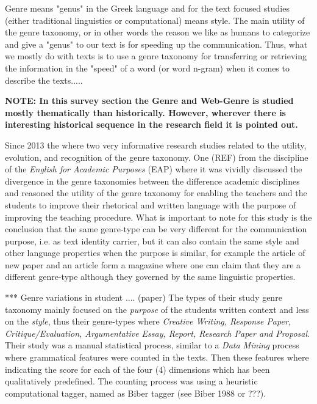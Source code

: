 Genre means "genus" in the Greek language and for the text focused studies (either traditional linguistics or computational) means style. The main utility of the genre taxonomy, or in other words the reason we like as humans to categorize and give a "genus" to our text is for speeding up the communication. Thus, what we mostly do with texts is to use a genre taxonomy for transferring or retrieving the information in the "speed" of a word (or word n-gram) when it comes to describe the texts.....

\textbf{NOTE: In this survey section the Genre and Web-Genre is studied mostly thematically than historically. However, wherever there is interesting historical sequence in the research field it is pointed out.}


Since 2013 the where two very informative research studies related to the utility, evolution, and recognition of the genre taxonomy. One (REF) from the discipline of the \textit{English for Academic Purposes} (EAP) where it was vividly discussed the divergence in the genre taxonomies between the difference academic disciplines and reasoned the utility of the genre taxonomy for enabling the teachers and the students to improve their rhetorical and written language with the purpose of improving the teaching procedure. What is important to note for this study is the conclusion that the same genre-type can be very different for the communication purpose, i.e. as text identity carrier, but it can also contain the same style and other language properties when the purpose is similar, for example the article of new paper and an article form a magazine where one can claim that they are a different genre-type although they governed by the same linguistic properties.

*** Genre variations in student .... (paper)
The types of their study genre taxonomy mainly focused on the \textit{purpose} of the students written context and less on the \textit{style}, thus their genre-types where \textit{Creative Writing, Response Paper, Critique/Evaluation, Argumentative Essay, Report, Research Paper and Proposal}. Their study was a manual statistical process, similar to a \textit{Data Mining} process where grammatical features were counted in the texts. Then these features where indicating the score for each of the four (4) dimensions which has been qualitatively predefined. The counting process was using a heuristic computational tagger, named as Biber tagger (see Biber 1988 or ???).   

